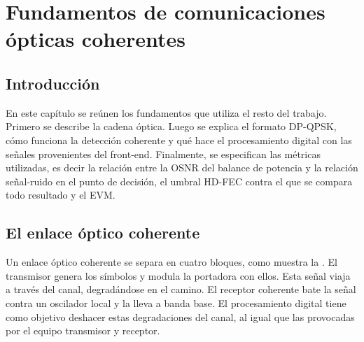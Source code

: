 
\chapter{Fundamentos de comunicaciones \'opticas coherentes}
\label{cap:coherentes}

\section{Introducci\'on}
\label{sec:coh-intro}

En este cap\'itulo se re\'unen los fundamentos que utiliza el resto del trabajo. Primero
se describe la cadena óptica. Luego se explica el formato
DP-QPSK, c\'omo funciona la detecci\'on coherente y qu\'e hace el procesamiento
digital con las señales provenientes del front-end. Finalmente, se especifican las m\'etricas utilizadas, es decir la
relaci\'on entre la OSNR del balance de potencia y la relaci\'on se\~nal-ruido
en el punto de decisi\'on, el umbral HD-FEC contra el que se compara todo resultado y el EVM.

\section{El enlace \'optico coherente}
\label{sec:coh-enlace}

Un enlace \'optico coherente se separa en cuatro bloques, como muestra la
. El transmisor genera los s\'imbolos y modula la portadora con ellos. Esta se\~nal viaja a trav\'es del canal, degrad\'andose en el camino. El receptor
coherente bate la se\~nal contra un oscilador local y la lleva a banda base. El procesamiento digital tiene como objetivo deshacer estas degradaciones del canal, al igual que las provocadas por el equipo transmisor y receptor.

